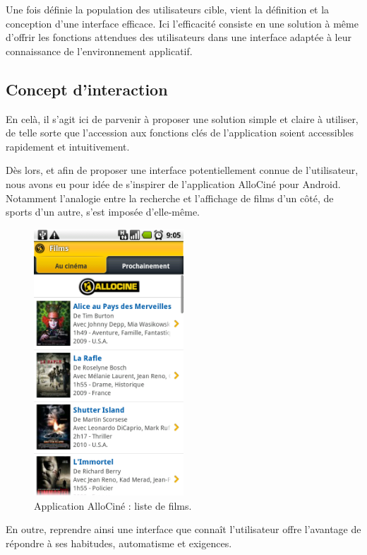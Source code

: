 \documentclass{article}
\begin{document}
	Une fois définie la population des utilisateurs cible, vient la définition et la conception d'une interface efficace. Ici l'efficacité consiste en une solution à même d'offrir les fonctions attendues des utilisateurs dans une interface adaptée à leur connaissance de l'environnement applicatif.

	\subsection{Concept d'interaction}

	En celà, il s'agit ici de parvenir à proposer une solution simple et claire à utiliser, de telle sorte que l'accession aux fonctions clés de l'application soient accessibles rapidement et intuitivement.

	Dès lors, et afin de proposer une interface potentiellement connue de l'utilisateur, nous avons eu pour idée de s'inspirer de l'application AlloCiné pour Android. Notamment l'analogie entre la recherche et l'affichage de films d'un côté, de sports d'un autre, s'est imposée d'elle-même.

	\begin{figure}[ht]
		\centering
		\includegraphics[width=0.5\textwidth]{allocine.png}
		\caption{Application AlloCiné : liste de films.}
		\label{fig:allocine}
	\end{figure}

	En outre, reprendre ainsi une interface que connaît l'utilisateur offre l'avantage de répondre à ses habitudes, automatisme	et exigences.
\end{document}
